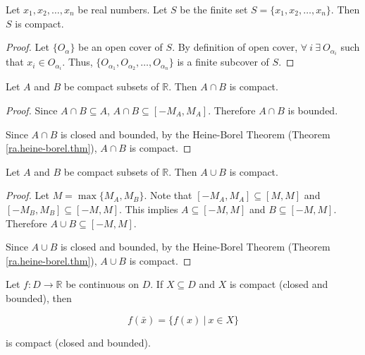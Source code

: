 \begin{proposition}\label{ra.hw6.1} Let \(x_1, x_2, \ldots, x_n\) be real numbers. Let \(S\) be the finite set \(S = \{x_1, x_2, \ldots, x_n\}\). Then \(S\) is compact.\end{proposition}

\begin{proof} Let \(\{O_\alpha\}\) be an open cover of \(S\). By definition of open cover, \(\forall \ i \ \exists \ O_{\alpha_i}\) such that \(x_i \in O_{\alpha_i}\). Thus, \( \{O_{\alpha_1}, O_{\alpha_2}, \ldots, O_{\alpha_n} \} \) is a finite subcover of \(S\). \end{proof}

\begin{proposition}\label{ra.hw6.5a} Let \(A\) and \(B\) be compact subsets of \(\mathbb{R}\). Then \(A \cap B\) is compact. \end{proposition}

\begin{proof} Since \(A \cap B \subseteq A\), \(A \cap B \subseteq [-M_A, M_A]\). Therefore \(A \cap B\) is bounded.

Since \(A \cap B\) is closed and bounded, by the Heine-Borel Theorem (Theorem \ref{ra.heine-borel.thm}), \(A \cap B\) is compact.

\end{proof}

\begin{proposition}\label{ra.hw6.5b} Let \(A\) and \(B\) be compact subsets of \(\mathbb{R}\). Then \(A \cup B\) is compact. \end{proposition}

\begin{proof} Let \(M = \max \{ M_A, M_B \} \). Note that \([-M_A, M_A] \subseteq [M, M]\) and \([-M_B, M_B] \subseteq [-M, M]\). This implies \(A \subseteq [-M, M]\) and \(B \subseteq [-M, M]\). Therefore \(A \cup B \subseteq [-M, M]\).

Since \(A \cup B\) is closed and bounded, by the Heine-Borel Theorem (Theorem \ref{ra.heine-borel.thm}), \(A \cup B\) is compact.

\end{proof}

\begin{theorem} Let \(f: D \to \mathbb{R}\) be continuous on \(D\). If \(X \subseteq D\) and \(X\) is compact (closed and bounded), then

\[
f(\bar{x}) = \{f(x) \ | \ x \in X\}
\]

is compact (closed and bounded).

\end{theorem}

